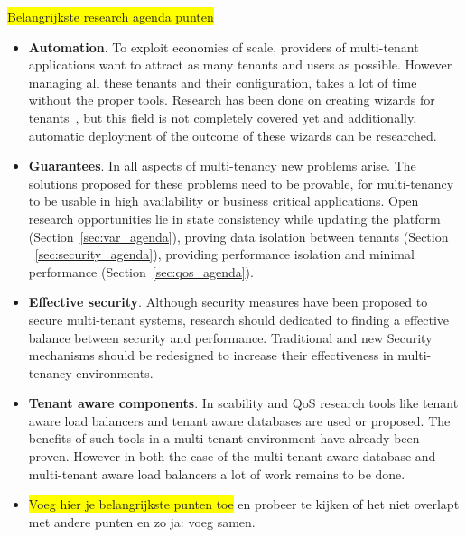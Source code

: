 \documentclass{article}
\newcommand{\highlight}[1]{\colorbox{yellow}{#1}}
\begin{document}
\highlight{Belangrijkste research agenda punten}
\begin{itemize}

\item \textbf{Automation}. 
To exploit economies of scale, providers of multi-tenant applications want to attract as many tenants and users as possible. 
However managing all these tenants and their configuration, takes a lot of time without the proper tools. 
Research has been done on creating wizards for tenants~\cite{mietzner2008generation,mietzner2008defining}, but this field is not completely covered yet and additionally, automatic deployment of the outcome of these wizards can be researched. 
\item \textbf{Guarantees}. 
In all aspects of multi-tenancy new problems arise. 
The solutions proposed for these problems need to be provable, for multi-tenancy to be usable in high availability or business critical applications. 
Open research opportunities lie in state consistency while updating the platform (Section~\ref{sec:var_agenda}), proving data isolation between tenants (Section ~\ref{sec:security_agenda}), providing performance isolation and minimal performance (Section~\ref{sec:qos_agenda}).
\item \textbf{Effective security}.
Although security measures have been proposed to secure multi-tenant systems, research should dedicated to finding a effective balance between security and performance. Traditional and new Security mechanisms should be redesigned to increase their effectiveness in multi-tenancy environments.
\item \textbf{Tenant aware components}.
In scability and \ac{QoS} research tools like tenant aware load balancers and tenant aware databases are used or proposed.
The benefits of such tools in a multi-tenant environment have already been proven.
However in both the case of the multi-tenant aware database and multi-tenant aware load balancers a lot of work remains to be done.

\item \highlight{Voeg hier je belangrijkste punten toe}  en probeer te kijken of het niet overlapt met andere punten en zo ja: voeg samen.
\end{itemize}



\end{document}
